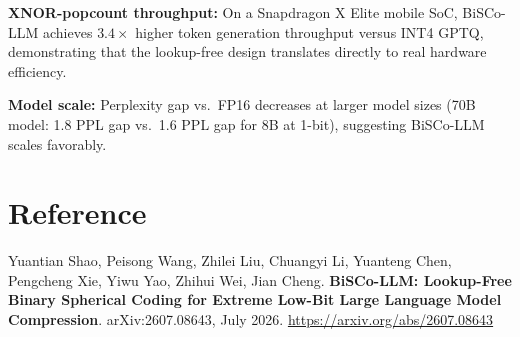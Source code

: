 \documentclass[10pt,twocolumn]{article}
\begin{document}
\textbf{XNOR-popcount throughput:} On a Snapdragon X Elite mobile SoC,
BiSCo-LLM achieves $3.4\times$ higher token generation throughput versus
INT4 GPTQ, demonstrating that the lookup-free design translates directly
to real hardware efficiency.

\textbf{Model scale:} Perplexity gap vs.\ FP16 decreases at larger
model sizes (70B model: 1.8 PPL gap vs.\ 1.6 PPL gap for 8B at 1-bit),
suggesting BiSCo-LLM scales favorably.

\section*{Reference}

Yuantian Shao, Peisong Wang, Zhilei Liu, Chuangyi Li, Yuanteng Chen,
Pengcheng Xie, Yiwu Yao, Zhihui Wei, Jian Cheng.
\textbf{BiSCo-LLM: Lookup-Free Binary Spherical Coding for Extreme
Low-Bit Large Language Model Compression}.
arXiv:2607.08643, July 2026.
\url{https://arxiv.org/abs/2607.08643}
\end{document}
